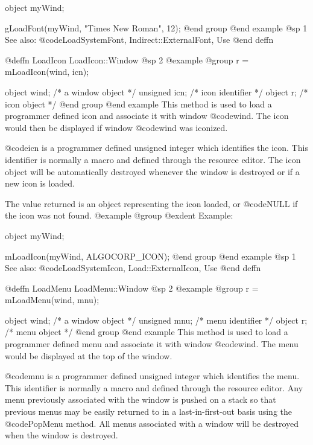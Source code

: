 object  myWind;

gLoadFont(myWind, "Times New Roman", 12);
@end group
@end example
@sp 1
See also:  @code{LoadSystemFont, Indirect::ExternalFont, Use}
@end deffn









@deffn {LoadIcon} LoadIcon::Window
@sp 2
@example
@group
r = mLoadIcon(wind, icn);

object   wind;  /*  a window object  */
unsigned icn;   /*  icon identifier  */
object   r;     /*  icon object      */
@end group
@end example
This method is used to load a programmer defined icon and associate it
with window @code{wind}.  The icon would then be displayed if window
@code{wind} was iconized.

@code{icn} is a programmer defined unsigned integer which identifies
the icon.  This identifier is normally a macro and defined through the
resource editor.  The icon object will be automatically destroyed
whenever the window is destroyed or if a new icon is loaded.

The value returned is an object representing the icon loaded, or
@code{NULL} if the icon was not found.
@example
@group
@exdent Example:

object  myWind;

mLoadIcon(myWind, ALGOCORP_ICON);
@end group
@end example
@sp 1
See also:  @code{LoadSystemIcon, Load::ExternalIcon, Use}
@end deffn








@deffn {LoadMenu} LoadMenu::Window
@sp 2
@example
@group
r = mLoadMenu(wind, mnu);

object   wind;  /*  a window object  */
unsigned mnu;   /*  menu identifier  */
object   r;     /*  menu object      */
@end group
@end example
This method is used to load a programmer defined menu and associate it
with window @code{wind}.  The menu would be displayed at the top
of the window.

@code{mnu} is a programmer defined unsigned integer which identifies the
menu.  This identifier is normally a macro and defined through the
resource editor.  Any menu previously associated with the window is
pushed on a stack so that previous menus may be easily returned to in a
last-in-first-out basis using the @code{PopMenu} method.  All menus
associated with a window will be destroyed when the window is destroyed.


